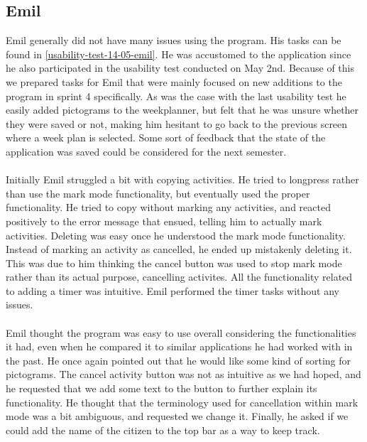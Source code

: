 \subsection{Emil}
Emil generally did not have many issues using the program. 
His tasks can be found in \autoref{usability-test-14-05-emil}.
He was accustomed to the application since he also participated in the usability test conducted on May 2nd. 
Because of this we prepared tasks for Emil that were mainly focused on new additions to the program in sprint 4 specifically.
As was the case with the last usability test he easily added pictograms to the weekplanner, but felt that he was unsure whether they were saved or not, making him hesitant to go back to the previous screen where a week plan is selected. 
Some sort of feedback that the state of the application was saved could be considered for the next semester.
\\\\
Initially Emil struggled a bit with copying activities.
He tried to longpress rather than use the mark mode functionality, but eventually used the proper functionality.
He tried to copy without marking any activities, and reacted positively to the error message that ensued, telling him to actually mark activities.
Deleting was easy once he understood the mark mode functionality.
Instead of marking an activity as cancelled, he ended up mistakenly deleting it.
This was due to him thinking the cancel button was used to stop mark mode rather than its actual purpose, cancelling activites.
All the functionality related to adding a timer was intuitive. 
Emil performed the timer tasks without any issues.
\\\\
Emil thought the program was easy to use overall considering the functionalities it had, even when he compared it to similar applications he had worked with in the past.
He once again pointed out that he would like some kind of sorting for pictograms.
The cancel activity button was not as intuitive as we had hoped, and he requested that we add some text to the button to further explain its functionality.
He thought that the terminology used for cancellation within mark mode was a bit ambiguous, and requested we change it.
Finally, he asked if we could add the name of the citizen to the top bar as a way to keep track.


